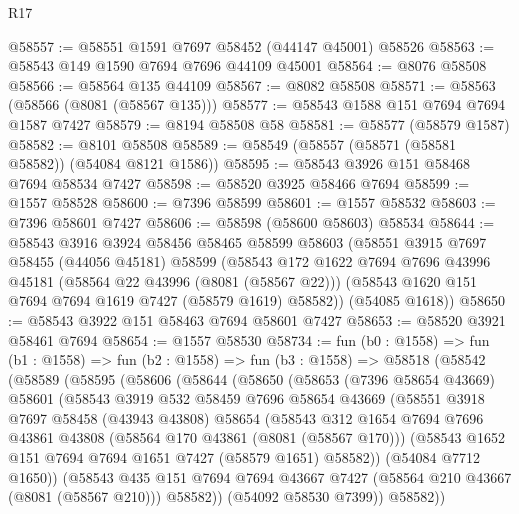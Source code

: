 \begin{lexlean}{R17}
\begin{coremodule}
@58557 := @58551 @1591 @7697 @58452 (@44147 @45001) @58526
@58563 := @58543 @149 @1590 @7694 @7696 @44109 @45001
@58564 := @8076 @58508
@58566 := @58564 @135 @44109
@58567 := @8082 @58508
@58571 := @58563 (@58566 (@8081 (@58567 @135)))
@58577 := @58543 @1588 @151 @7694 @7694 @1587 @7427
@58579 := @8194 @58508 @58
@58581 := @58577 (@58579 @1587)
@58582 := @8101 @58508
@58589 := @58549 (@58557 (@58571 (@58581 @58582)) (@54084 @8121 @1586))
@58595 := @58543 @3926 @151 @58468 @7694 @58534 @7427
@58598 := @58520 @3925 @58466 @7694
@58599 := @1557 @58528
@58600 := @7396 @58599
@58601 := @1557 @58532
@58603 := @7396 @58601 @7427
@58606 := @58598 (@58600 @58603) @58534
@58644 := @58543
    @3916
    @3924
    @58456
    @58465
    @58599
    @58603
    (@58551
      @3915
      @7697
      @58455
      (@44056 @45181)
      @58599
      (@58543
        @172
        @1622
        @7694
        @7696
        @43996
        @45181
        (@58564 @22 @43996 (@8081 (@58567 @22)))
        (@58543 @1620 @151 @7694 @7694 @1619 @7427 (@58579 @1619) @58582))
      (@54085 @1618))
@58650 := @58543 @3922 @151 @58463 @7694 @58601 @7427
@58653 := @58520 @3921 @58461 @7694
@58654 := @1557 @58530
@58734 := fun (b0 : @1558) =>
  fun (b1 : @1558) =>
  fun (b2 : @1558) =>
  fun (b3 : @1558) =>
  @58518
    (@58542
      (@58589
        (@58595
          (@58606
            (@58644
              (@58650
                (@58653
                  (@7396 @58654 @43669)
                  @58601
                  (@58543
                    @3919
                    @532
                    @58459
                    @7696
                    @58654
                    @43669
                    (@58551
                      @3918
                      @7697
                      @58458
                      (@43943 @43808)
                      @58654
                      (@58543
                        @312
                        @1654
                        @7694
                        @7696
                        @43861
                        @43808
                        (@58564 @170 @43861 (@8081 (@58567 @170)))
                        (@58543 @1652 @151 @7694 @7694 @1651 @7427 (@58579 @1651) @58582))
                      (@54084 @7712 @1650))
                    (@58543
                      @435
                      @151
                      @7694
                      @7694
                      @43667
                      @7427
                      (@58564 @210 @43667 (@8081 (@58567 @210)))
                      @58582))
                  (@54092 @58530 @7399))
                @58582))

\end{coremodule}
\end{lexlean}
